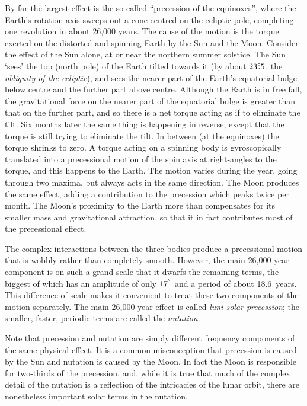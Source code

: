 \documentclass[11pt,twoside]{article}
\newcommand{\degree}[2] {$#1^{\circ}
                        \hspace{-0.37em}.\hspace{0.02em}#2$}
\newcommand{\arcseci}[1] {$#1\hspace{-0.05em}$\raisebox{-0.5ex}
                         {$^{'\hspace{-0.1em}'}$}}
\renewcommand{\arcseci}[1] {$#1\hspace{-0.05em}^{'\hspace{-0.1em}'}$}
\begin{document}
By far the largest effect is the
so-called ``precession of the equinoxes'', where the Earth's
rotation axis sweeps out a cone centred on the ecliptic
pole, completing one revolution in about 26,000 years.  The
cause of the motion is the torque exerted on the distorted and
spinning Earth by the Sun and the Moon.  Consider the effect of the
Sun alone, at or near the northern summer solstice.  The Sun
`sees' the top (north pole) of the Earth tilted towards it
(by about \degree{23}{5}, the {\it obliquity of the
ecliptic}\/),
and sees the nearer part of the Earth's equatorial bulge
below centre and the further part above centre.
Although the Earth is in free fall,
the gravitational force on the nearer part of the
equatorial bulge is greater than that on the further part, and
so there is a net torque acting
as if to eliminate the tilt.  Six months later the same thing
is happening in reverse, except that the torque is still
trying to eliminate the tilt.  In between (at the equinoxes) the
torque shrinks to zero.  A torque acting on a spinning body
is gyroscopically translated
into a precessional motion of the spin axis at right-angles to the torque,
and this happens to the Earth.
The motion varies during the
year, going through two maxima, but always acts in the
same direction.  The Moon produces the same effect,
adding a contribution to the precession which peaks twice
per month.  The Moon's proximity to the Earth more than compensates
for its smaller mass and gravitational attraction, so that it
in fact contributes most of the precessional effect.

The complex interactions between the three bodies produce a
precessional motion that is wobbly rather than completely smooth.
However, the main 26,000-year component is on such a grand scale that
it dwarfs the remaining terms, the biggest of
which has an amplitude of only \arcseci{17} and a period of
about 18.6~years.  This difference of scale makes it convenient to treat
these two components of the motion separately.  The main 26,000-year
effect is called {\it luni-solar precession};  the smaller,
faster, periodic terms are called the {\it nutation}.

Note that precession and nutation are simply
different frequency components of the same physical effect.  It is
a common misconception that precession is caused
by the Sun and nutation is caused by the Moon.  In fact
the Moon is responsible for two-thirds of the precession, and,
while it is true that much of the complex detail of the nutation is
a reflection of the intricacies of the lunar orbit, there are
nonetheless important solar terms in the nutation.
\end{document}
